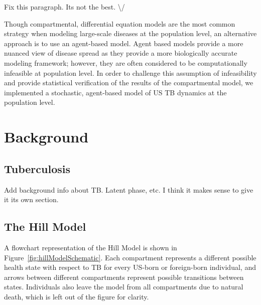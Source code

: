 \documentclass{amsart}
\begin{document}
{\huge \color{red} Fix this paragraph. Its not the best. \textbackslash/}

Though compartmental, differential equation models are the most common strategy
when modeling large-scale diseases at the population level, an alternative
approach is to use an agent-based model. Agent
based models provide a more nuanced view of disease spread as they provide a
more biologically accurate modeling framework; however, they are often
considered to be computationally infeasible at population level. In order to
challenge this assumption of infeasibility and provide statistical verification
of the results of the compartmental model, we implemented a stochastic,
agent-based model of US TB dynamics at the population level.

\section{Background}
\subsection{Tuberculosis}
{\huge \color{red} Add background info about TB. Latent phase, etc. I think it
makes sense to give it its own section.}
\subsection{The Hill Model}
A flowchart representation of the Hill Model is shown in
Figure~\ref{fig:hillModelSchematic}. Each compartment represents a different
possible health state with respect to TB for every US-born or foreign-born
individual, and arrows between different compartments represent possible
transitions between states.  Individuals also leave the model from all
compartments due to natural death, which is left out of the figure for clarity.
\end{document}
